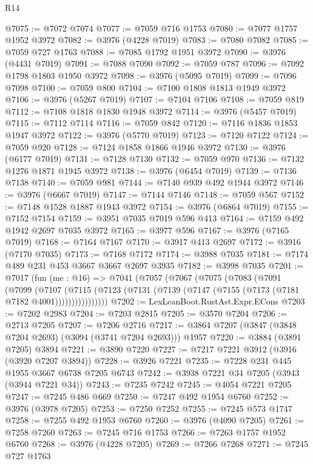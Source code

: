 \begin{lexlean}{R14}
\begin{coremodule}
@7075 := @7072 @7074
@7077 := @7059 @716 @1753
@7080 := @7077 @1757 @1952 @3972
@7082 := @3976 (@4228 @7019)
@7083 := @7080 @7082
@7085 := @7059 @727 @1763
@7088 := @7085 @1792 @1951 @3972
@7090 := @3976 (@4431 @7019)
@7091 := @7088 @7090
@7092 := @7059 @787
@7096 := @7092 @1798 @1803 @1950 @3972
@7098 := @3976 (@5095 @7019)
@7099 := @7096 @7098
@7100 := @7059 @800
@7104 := @7100 @1808 @1813 @1949 @3972
@7106 := @3976 (@5267 @7019)
@7107 := @7104 @7106
@7108 := @7059 @819
@7112 := @7108 @1818 @1830 @1948 @3972
@7114 := @3976 (@5457 @7019)
@7115 := @7112 @7114
@7116 := @7059 @842
@7120 := @7116 @1836 @1853 @1947 @3972
@7122 := @3976 (@5770 @7019)
@7123 := @7120 @7122
@7124 := @7059 @920
@7128 := @7124 @1858 @1866 @1946 @3972
@7130 := @3976 (@6177 @7019)
@7131 := @7128 @7130
@7132 := @7059 @970
@7136 := @7132 @1276 @1871 @1945 @3972
@7138 := @3976 (@6454 @7019)
@7139 := @7136 @7138
@7140 := @7059 @981
@7144 := @7140 @939 @492 @1944 @3972
@7146 := @3976 (@6667 @7019)
@7147 := @7144 @7146
@7148 := @7059 @567
@7152 := @7148 @1528 @1887 @1943 @3972
@7154 := @3976 (@6864 @7019)
@7155 := @7152 @7154
@7159 := @3951 @7035 @7019 @596 @413
@7164 := @7159 @492 @1942 @2697 @7035 @3972
@7165 := @3977 @596
@7167 := @3976 (@7165 @7019)
@7168 := @7164 @7167
@7170 := @3917 @413 @2697
@7172 := @3916 (@7170 @7035)
@7173 := @7168 @7172
@7174 := @3988 @7035
@7181 := @7174 @489 @231 @453 @3667 @3667 @2697 @3935
@7182 := @3998 @7035
@7201 := @7017
    (fun (me : @16) =>
    @7041
      (@7057
        (@7067
          (@7075
            (@7083
              (@7091
                (@7099
                  (@7107
                    (@7115
                      (@7123 (@7131 (@7139 (@7147 (@7155 (@7173 (@7181 @7182 @4001))))))))))))))))
@7202 := LexLeanBoot.RustAst.Expr.ECons
@7203 := @7202 @2983
@7204 := @7203 @2815
@7205 := @3570 @7204
@7206 := @2713 @7205
@7207 := @7206 @2716
@7217 := @3864 @7207 (@3847 (@3848 @7204 @2693) (@3094 (@3741 @7204 @2693))) @1957
@7220 := @3884 (@3891 @7205) @3894
@7221 := @3890 @7220
@7227 := @7217 @7221 @3912 (@3916 (@3920 @7207 @3894))
@7228 := @3926 @7221
@7235 := @7228 @231 @445 @1955 @3667 @6738 @7205 @6743
@7242 := @3938 @7221 @34 @7205 (@3943 (@3944 @7221 @34))
@7243 := @7235 @7242
@7245 := @4054 @7221 @7205
@7247 := @7245 @486 @669
@7250 := @7247 @492 @1954 @6760
@7252 := @3976 (@3978 @7205)
@7253 := @7250 @7252
@7255 := @7245 @573 @1747
@7258 := @7255 @492 @1953 @6760
@7260 := @3976 (@4090 @7205)
@7261 := @7258 @7260
@7263 := @7245 @716 @1753
@7266 := @7263 @1757 @1952 @6760
@7268 := @3976 (@4228 @7205)
@7269 := @7266 @7268
@7271 := @7245 @727 @1763

\end{coremodule}
\end{lexlean}
